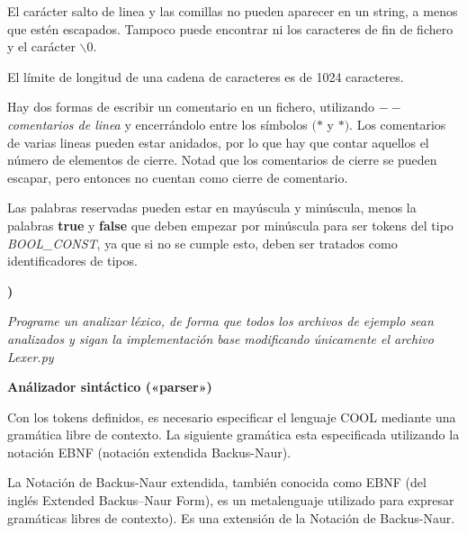 \documentclass{article}
\newcounter{pregunta}
\newcommand\prop[1]%
{\addtocounter{pregunta}{1}
\noindent%
{\color{naranja_muy}\small\bf\thepregunta)}
\parbox[t]{.95\linewidth}{\it #1}}
\begin{document}
El carácter salto de linea y las comillas  no pueden aparecer en un string, a menos que
estén escapados. Tampoco puede encontrar ni los caracteres de fin de
fichero y el carácter $\backslash 0$.

El límite de longitud de una cadena de caracteres es de 1024 caracteres.

Hay dos formas de escribir un comentario en un fichero, utilizando
$--$ \emph{comentarios de linea} y  encerrándolo  entre los símbolos $(*$ y
$*)$. Los comentarios de varias lineas pueden estar anidados, por lo
que hay que contar aquellos el número de elementos de cierre. Notad
que los comentarios de cierre se pueden escapar, pero entonces no
cuentan como cierre de comentario.

Las palabras reservadas  pueden estar en mayúscula y minúscula, menos
la palabras \textbf{true} y \textbf{false} que deben empezar por minúscula para ser tokens del tipo \emph{BOOL\_CONST}, ya que si no se cumple esto, deben ser tratados como identificadores de tipos. 

\prop{Programe un analizar léxico, de forma que todos los archivos de ejemplo sean analizados y sigan la implementación base modificando únicamente el archivo Lexer.py}
\label{sec:org7564041}



\vspace{5mm}\centerline{\large\bf Análizador sintáctico («parser»)}\vspace{5mm}
\label{sec:orgdbd8459}


Con los tokens definidos, es necesario especificar el lenguaje COOL mediante una gramática libre de contexto. La siguiente gramática esta especificada utilizando la notación EBNF (notación extendida Backus-Naur).

La Notación de Backus-Naur extendida, también conocida como EBNF (del inglés Extended Backus–Naur Form), es un metalenguaje utilizado para expresar gramáticas libres de contexto). Es una extensión de la Notación de Backus-Naur.
\end{document}
